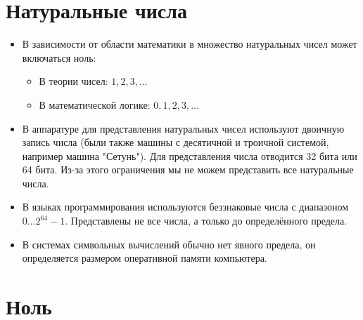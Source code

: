 \documentclass{article}
\begin{document}
 
\tableofcontents

\section{Натуральные числа}

\begin{itemize}
\item[] В зависимости от области математики в множество натуральных чисел может включаться ноль:
  \begin{itemize}
  \item В теории чисел: $1, 2, 3, \ldots$
  \item В математической логике: $0, 1, 2, 3, \ldots$
  \end{itemize}

\item[] В аппаратуре для представления натуральных чисел используют двоичную запись числа 
(были также машины с десятичной и троичной системой, например машина "Сетунь"). 
Для представления числа отводится 32 бита или 64 бита. Из-за этого ограничения мы не можем представить все натуральные числа.

\item[] В языках программирования используются беззнаковые числа с диапазоном $0 \ldots 2^{64}-1$. 
Представлены не все числа, а только до определённого предела.

\item[] В системах символьных вычислений обычно нет явного предела, он определяется размером оперативной памяти компьютера.
\end{itemize}

\section{Ноль}
\paragraph{}
\end{document}
